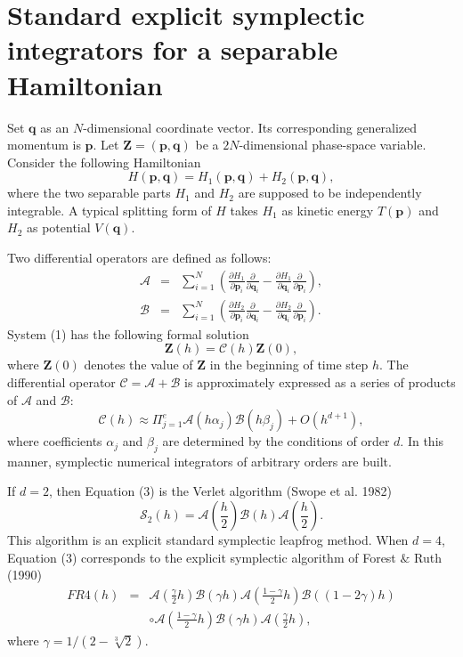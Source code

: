\documentclass[preprint2]{aastex}
\begin{document}
\section{Standard explicit symplectic integrators for a separable Hamiltonian}

Set $\mathbf{q}$ as an $N$-dimensional coordinate vector. Its
corresponding generalized momentum is $\mathbf{p}$. Let
$\mathbf{Z}=(\mathbf{p},\mathbf{q})$ be a $2N$-dimensional
phase-space variable. Consider the following Hamiltonian
\begin{equation}
H(\mathbf{p},\mathbf{q})=H_1(\mathbf{p},\mathbf{q})+H_2(\mathbf{p},\mathbf{q}),
\end{equation}
where the two separable parts $H_1$ and $H_2$ are supposed to be
independently integrable. A typical splitting form of $H$ takes
$H_1$ as kinetic energy $T(\mathbf{p})$ and $H_2$ as potential
$V(\mathbf{q})$.

Two differential operators are defined as follows:
\begin{eqnarray}
\mathcal{A} &=&\sum^{N}_{i=1}(\frac{\partial H_1}{\partial
\mathbf{p}_i}\frac{\partial }{\partial
\mathbf{q}_i}-\frac{\partial H_1}{\partial
\mathbf{q}_i}\frac{\partial }{\partial \mathbf{p}_i}), \nonumber
\\ \mathcal{B} &=&\sum^{N}_{i=1}(\frac{\partial H_2}{\partial
\mathbf{p}_i}\frac{\partial }{\partial
\mathbf{q}_i}-\frac{\partial H_2}{\partial
\mathbf{q}_i}\frac{\partial }{\partial \mathbf{p}_i}). \nonumber
\end{eqnarray}
System (1) has the following formal solution
\begin{equation}
\mathbf{Z}(h)=\mathcal{C}(h)\mathbf{Z}(0),
\end{equation}
where $\mathbf{Z}(0)$ denotes the value of $\mathbf{Z}$ in the
beginning of time step $h$. The differential operator
$\mathcal{C}=\mathcal{A}+\mathcal{B}$ is approximately expressed
as a series of products of $\mathcal{A}$ and $\mathcal{B}$:
\begin{equation}
\mathcal{C}(h)\approx \Pi^{e}_{j=1}\mathcal{A}(h\alpha_j)
\mathcal{B}(h\beta_j)+O(h^{d+1}),
\end{equation}
where coefficients $\alpha_j$ and $\beta_j$ are determined by the
conditions of order $d$. In this manner, symplectic numerical
integrators of arbitrary orders are built.

If $d=2$, then Equation (3) is the Verlet algorithm (Swope et al.
1982)
\begin{equation}
\mathcal{S}_2(h)=\mathcal{A}(\frac{h}{2})
\mathcal{B}(h)\mathcal{A}(\frac{h}{2}).
\end{equation}
This algorithm is an explicit standard symplectic leapfrog method.
When $d=4$, Equation (3) corresponds to the  explicit symplectic
algorithm of Forest $\&$ Ruth (1990)
\begin{eqnarray}
FR4(h) &=& \mathcal{A}(\frac{\gamma}{2}h) \mathcal{B}(\gamma
h)\mathcal{A}(\frac{1-\gamma}{2}h) \mathcal{B}((1-2\gamma)h)
\nonumber
\\ && \circ
\mathcal{A}(\frac{1-\gamma}{2}h)\mathcal{B}(\gamma
h)\mathcal{A}(\frac{\gamma}{2}h),
\end{eqnarray}
where $\gamma=1/(2-\sqrt[3]{2})$.
\end{document}
